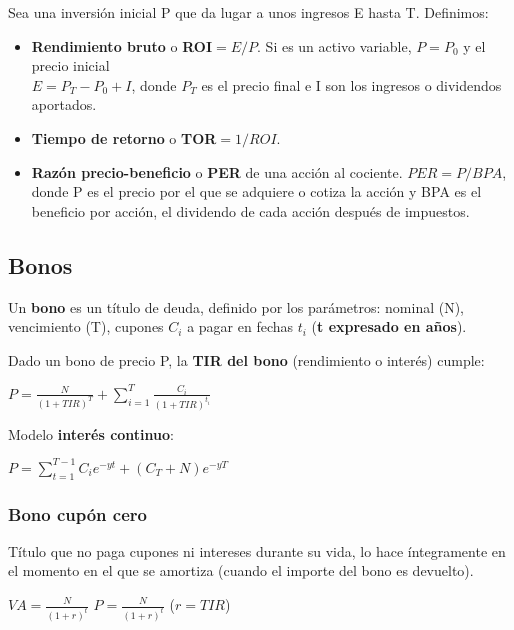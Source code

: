 \documentclass[
10pt, %
a4paper, %
oneside, %
headinclude,footinclude, %
BCOR5mm, %
]{scrartcl}
\newcommand{\n}[1]{\textbf{#1}}
\newcommand{\sub}[1]{_{#1}}
\newcommand{\pot}[1]{^{#1}}
\newcommand{\f}[1]{{\large{${#1}$}}}
\newcommand{\sumatorio}[2]{\sum_{#1}^{#2}}
\newcounter{ex}
\begin{document}
		Sea una inversión inicial P que da lugar a unos ingresos E hasta T. Definimos:
		\begin{itemize}
			\item \n{Rendimiento bruto} o \n{ROI}\f{= E/P}. Si es un activo variable, \f{P = P\sub{0}} y el precio inicial \\ \f{E = P\sub{T} - P\sub{0} + I}, donde \f{P\sub{T}} es el precio final e I son los ingresos o dividendos aportados.
			\item \n{Tiempo de retorno} o \n{TOR}\f{= 1/ROI}.
			\item \n{Razón precio-beneficio} o \n{PER} de una acción al cociente. \f{PER = P/BPA}, donde P es el precio por el que se adquiere o cotiza la acción y BPA es el beneficio por acción, el dividendo de cada acción después de impuestos.
		\end{itemize}

	\subsection{Bonos}

		Un \n{bono} es un título de deuda, definido por los parámetros: nominal (N), vencimiento (T), cupones \f{C\sub{i}} a pagar en fechas \f{t\sub{i}} (\n{t expresado en años}).

		Dado un bono de precio P, la \n{TIR del bono} (rendimiento o interés) cumple:
		\begin{center} \f{P = \frac{N}{(1+TIR)\pot{T}} + \sumatorio{i = 1}{T} \frac{C\sub{i}}{(1 + TIR)\pot{t\sub{i}}} } \end{center}

		Modelo \n{interés continuo}:
		\begin{center} \f{P = \sumatorio{t = 1}{T-1} C\sub{i} e\pot{-yt} + (C\sub{T} + N)e\pot{-yT}} \end{center}

		\subsubsection{Bono cupón cero}
		
		Título que no paga cupones ni intereses durante su vida, lo hace íntegramente en el momento en el que se amortiza (cuando el importe del bono es devuelto).

		\begin{center}\f{VA = \frac{N}{(1+r)\pot{t}}} \hspace{0.5cm} \f{P = \frac{N}{(1+r)\pot{t}}} \hspace{0.5cm} (\f{r = TIR}) \end{center} 
				
\end{document}

